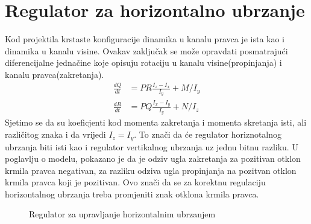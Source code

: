 \section{Regulator za horizontalno ubrzanje}
Kod projektila krstaste konfiguracije dinamika u kanalu pravca je ista kao i dinamika u kanalu visine. 
Ovakav zaključak se može opravdati posmatrajući diferencijalne jednačine koje opisuju 
rotaciju u kanalu visine(propinjanja) i kanalu pravca(zakretanja). 
\begin{align*}
    \frac{dQ}{dt} &= PR\frac{I_z-I_x}{I_y} + M/I_y\\
    \frac{dR}{dt} &= PQ\frac{I_x-I_y}{I_y} + N/I_z
\end{align*}
Sjetimo se da su koeficjenti kod momenta zakretanja i momenta skretanja isti, ali različitog znaka i da vrijedi $I_z = I_y $. 
To znači da će regulator horiznotalnog ubrzanja biti isti kao i regulator 
vertikalnog ubrzanja uz jednu bitnu razliku. U poglavlju o modelu, pokazano je da je odziv ugla zakretanja 
za pozitivan otklon krmila pravca negativan, za razliku odziva ugla propinjanja na pozitvan otklon krmila pravca koji je 
pozitivan. Ovo znači da se za korektnu regulaciju horizontalnog ubrzanja treba promjeniti znak 
otklona krmila pravca. 
\begin{figure}[!ht]
    \centering
    \caption{Regulator za upravljanje horizontalnim ubrzanjem}
    \end{figure}
